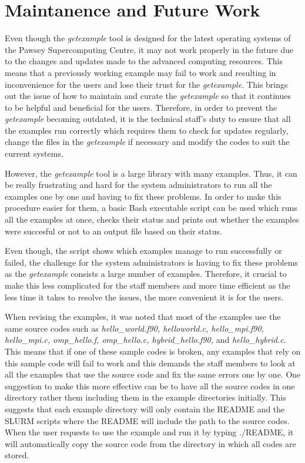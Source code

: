 \section{Maintanence and Future Work}

Even though the \emph{getexample} tool is designed for the latest operating systems of the Pawsey Supercomputing Centre, it may not work properly in the future
due to the changes and updates made to the advanced computing resources. This means that a previously working example may fail to work and resulting in 
inconvenience for the users and lose their trust for the \emph{getexample.} This brings out the issue of how to maintain and curate the \emph{getexample} so that it 
continues to be helpful and beneficial for the users. Therefore, in order to prevent the \emph{getexample} becoming outdated, it is the technical staff's duty 
to ensure that all the examples run correctly which requires them to check for updates regularly, change the files in the \emph{getexample} if necessary and 
modify the codes to suit the current systems.

However, the \emph{getexample} tool is a large library with many examples. Thus, it can be really frustrating and hard for the system administrators to run 
all the examples one by one and having to fix these problems. In order to make this procedure easier for them, a basic Bash executable script can be 
used which runs all the examples at once, checks their status and prints out whether the examples were succesful or not to an output file based on their
status.

Even though, the script shows which examples manage to run successfully or failed, the challenge for the system administrators is having to fix 
these problems as the \emph{getexample} consists a large number of examples. Therefore, it crucial to make this less complicated for the staff members and more
time efficient as the less time it takes to resolve the issues, the more convenient it is for the users. 

When revising the examples, it was noted that most of the examples use the same source codes such as \emph{hello\_world.f90, helloworld.c, 
hello\_mpi.f90, hello\_mpi.c, omp\_hello.f, omp\_hello.c, hybrid\_hello.f90,} and \emph{hello\_hybrid.c}. This means that if one of these sample codes is
broken, any examples that rely on this sample code will fail to work and this demands the staff members to look at all the examples that use the source
code and fix the same errors one by one. One suggestion to make this more effective can be to have all the source codes in one directory rather them
including them in the example directories initially. This suggests that each example directory will only contain the README and the SLURM scripts where
the README will include the path to the source codes. When the user requests to use the example and run it by typing ./README, it will automatically
copy the source code from the directory in which all codes are stored.

